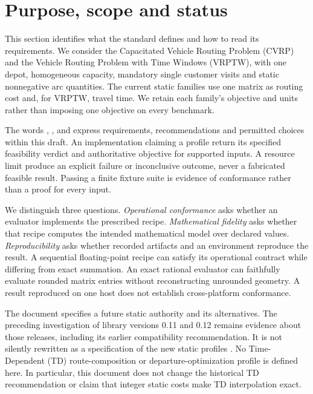 \section{Purpose, scope and status}\label{sec:scope}
This section identifies what the standard defines and how to read its requirements. We consider the Capacitated Vehicle Routing Problem (CVRP) and the Vehicle Routing Problem with Time Windows (VRPTW), with one depot, homogeneous capacity, mandatory single customer visits and static nonnegative arc quantities. The current static families use one matrix as routing cost and, for VRPTW, travel time. We retain each family's objective and units rather than imposing one objective on every benchmark.

The words \must{}, \mustnot{}, \should{} and \may{} express requirements, recommendations and permitted choices within this draft. An implementation claiming a profile \must{} return its specified feasibility verdict and authoritative objective for supported inputs. A resource limit \must{} produce an explicit failure or inconclusive outcome, never a fabricated feasible result. Passing a finite fixture suite is evidence of conformance rather than a proof for every input.

We distinguish three questions. \emph{Operational conformance} asks whether an evaluator implements the prescribed recipe. \emph{Mathematical fidelity} asks whether that recipe computes the intended mathematical model over declared values. \emph{Reproducibility} asks whether recorded artifacts and an environment reproduce the result. A sequential floating-point recipe can satisfy its operational contract while differing from exact summation. An exact rational evaluator can faithfully evaluate rounded matrix entries without reconstructing unrounded geometry. A result reproduced on one host does not establish cross-platform conformance.

The document specifies a future static authority and its alternatives. The preceding investigation of library versions 0.11 and 0.12 remains evidence about those releases, including its earlier compatibility recommendation. It is not silently rewritten as a specification of the new static profiles \autocite{rascoussierNumericalContracts2026}. No Time-Dependent (TD) route-composition or departure-optimization profile is defined here. In particular, this document does not change the historical TD recommendation or claim that integer static costs make TD interpolation exact.

